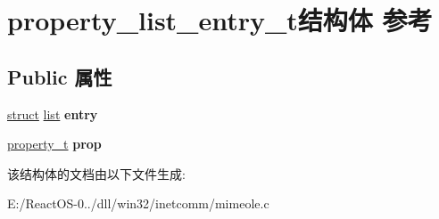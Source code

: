 \hypertarget{structproperty__list__entry__t}{}\section{property\+\_\+list\+\_\+entry\+\_\+t结构体 参考}
\label{structproperty__list__entry__t}
\subsection*{Public 属性}
\begin{DoxyCompactItemize}
\item 
\mbox{\label{structproperty__list__entry__t_a342a17480894ed5178794c894d4e5568}} 
\hyperlink{interfacestruct}{struct} \hyperlink{classlist}{list} {\bfseries entry}
\item 
\mbox{\label{structproperty__list__entry__t_ade406425a0147515c6217e0b3d97192b}} 
\hyperlink{structproperty__t}{property\+\_\+t} {\bfseries prop}
\end{DoxyCompactItemize}


该结构体的文档由以下文件生成\+:\begin{DoxyCompactItemize}
\item 
E\+:/\+React\+O\+S-\/0../dll/win32/inetcomm/mimeole.\+c\end{DoxyCompactItemize}
